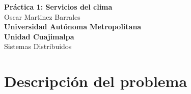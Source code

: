 \documentclass[12pt]{article}
\begin{document}
\begin{titlepage}
    \centering
    \vspace*{3cm}
    \Huge{\textbf{Práctica 1: Servicios del clima}}\\[0.5cm]
    \Large{Oscar Martinez Barrales}\\[0.5cm]
    \Large{\textbf{Universidad Autónoma Metropolitana}}\\[0.5cm]
    \Large{\textbf{Unidad Cuajimalpa}}\\[0.5cm]
    \Large{Sistemas Distribuidos} 
\end{titlepage}
\section*{Descripción del problema}
\end{document}

